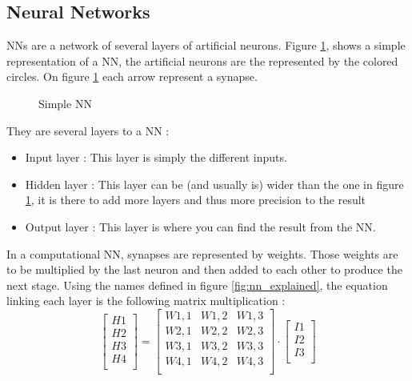 \subsection{Neural Networks}\label{sec:nn}

\acfp{NN} are a network of several layers of artificial neurons. Figure \ref{fig:snn}, shows a simple representation of a \ac{NN}, the artificial neurons are the represented by the colored circles. On figure \ref{fig:snn} each arrow represent a synapse.

\begin{figure}[h!]
  \centering
  
  \caption{Simple \acl{NN}}
  \label{fig:snn}
\end{figure}



They are several layers to a \ac{NN} :
\begin{itemize}
  \item Input layer : This layer is simply the different inputs.
  \item Hidden layer : This layer can be (and usually is) wider than the one in figure \ref{fig:snn}, it is there to add more layers and thus more precision to the result
  \item Output layer : This layer is where you can find the result from the \ac{NN}.
\end{itemize}

In a computational \ac{NN}, synapses are represented by weights. Those weights are to be multiplied by the last neuron and then added to each other to produce the next stage. Using the names defined in figure \ref{fig:nn_explained}, the equation linking each layer is the following matrix multiplication :
\begin{equation}
  \begin{bmatrix}
    H1\\ H2\\ H3\\ H4\\
  \end{bmatrix}
  =
  \begin{bmatrix}
    W1,1 & W1,2 & W1,3\\
    W2,1 & W2,2 & W2,3\\
    W3,1 & W3,2 & W3,3\\
    W4,1 & W4,2 & W4,3\\
  \end{bmatrix}
  \cdot
  \begin{bmatrix}
    I1\\ I2\\ I3\\
  \end{bmatrix}
\end{equation}

